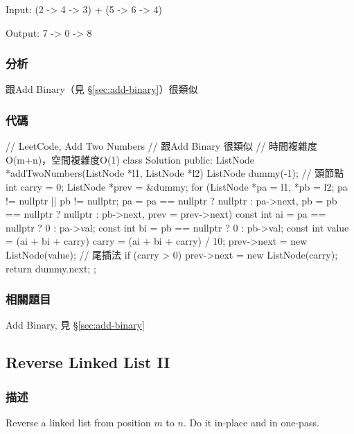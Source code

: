 Input: {\small {} (2 -> 4 -> 3) + (5 -> 6 -> 4)}

Output: {\small {} 7 -> 0 -> 8}


\subsubsection{分析}
跟Add Binary（見 \S \ref{sec:add-binary}）很類似


\subsubsection{代碼}
\begin{Code}
// LeetCode, Add Two Numbers
// 跟Add Binary 很類似
// 時間複雜度O(m+n)，空間複雜度O(1)
class Solution {
public:
    ListNode *addTwoNumbers(ListNode *l1, ListNode *l2) {
        ListNode dummy(-1); // 頭節點
        int carry = 0;
        ListNode *prev = &dummy;
        for (ListNode *pa = l1, *pb = l2;
             pa != nullptr || pb != nullptr;
             pa = pa == nullptr ? nullptr : pa->next,
             pb = pb == nullptr ? nullptr : pb->next,
             prev = prev->next) {
            const int ai = pa == nullptr ? 0 : pa->val;
            const int bi = pb == nullptr ? 0 : pb->val;
            const int value = (ai + bi + carry) %
            carry = (ai + bi + carry) / 10;
            prev->next = new ListNode(value); // 尾插法
        }
        if (carry > 0)
            prev->next = new ListNode(carry);
        return dummy.next;
    }
};
\end{Code}


\subsubsection{相關題目}

\begindot
\item Add Binary, 見 \S \ref{sec:add-binary}
\myenddot


\subsection{Reverse Linked List II}
\label{sec:reverse-linked-list-ii}


\subsubsection{描述}
Reverse a linked list from position $m$ to $n$. Do it in-place and in one-pass.

